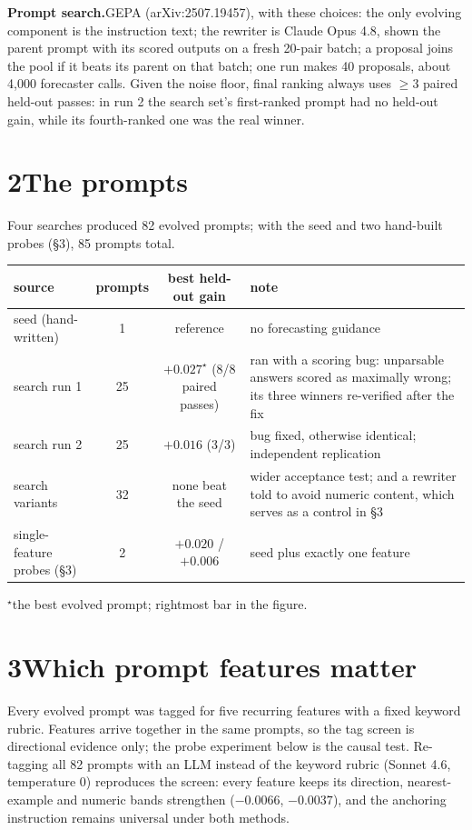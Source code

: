 \documentclass[10pt]{article}
\newcommand{\thepar}[1]{\vspace{2.5pt}\textbf{#1}\hspace{0.7em}}
\begin{document}
\thepar{Prompt search.}GEPA (arXiv:2507.19457), with these choices: the only evolving component is the instruction text; the rewriter is Claude Opus 4.8, shown the parent prompt with its scored outputs on a fresh 20-pair batch; a proposal joins the pool if it beats its parent on that batch; one run makes 40 proposals, about 4{,}000 forecaster calls. Given the noise floor, final ranking always uses $\geq3$ paired held-out passes: in run 2 the search set's first-ranked prompt had no held-out gain, while its fourth-ranked one was the real winner.

\section*{2\quad The prompts}

Four searches produced 82 evolved prompts; with the seed and two hand-built probes (\S3), 85 prompts total.

\begin{center}\small
\begin{tabular}{@{}p{6.3cm}cc p{5.1cm}@{}}
\toprule
source & prompts & best held-out gain & note\\
\midrule
seed (hand-written) & 1 & reference & no forecasting guidance\\[1pt]
search run 1 & 25 & $+0.027^{\star}$\; (8/8 paired passes) & ran with a scoring bug: unparsable answers scored as maximally wrong; its three winners re-verified after the fix\\[1pt]
search run 2 & 25 & $+0.016$\; (3/3) & bug fixed, otherwise identical; independent replication\\[1pt]
search variants & 32 & none beat the seed & wider acceptance test; and a rewriter told to avoid numeric content, which serves as a control in \S3\\[1pt]
single-feature probes (\S3) & 2 & $+0.020$ / $+0.006$ & seed plus exactly one feature\\
\bottomrule
\end{tabular}
\end{center}

{\footnotesize $^{\star}$the best evolved prompt; rightmost bar in the figure.}

\section*{3\quad Which prompt features matter}

Every evolved prompt was tagged for five recurring features with a fixed keyword rubric. Features arrive together in the same prompts, so the tag screen is directional evidence only; the probe experiment below is the causal test. Re-tagging all 82 prompts with an LLM instead of the keyword rubric (Sonnet 4.6, temperature 0) reproduces the screen: every feature keeps its direction, nearest-example and numeric bands strengthen ($-0.0066$, $-0.0037$), and the anchoring instruction remains universal under both methods.
\end{document}
